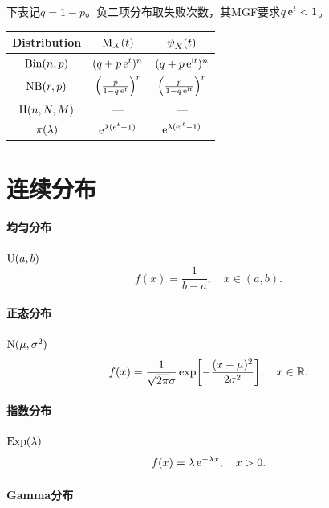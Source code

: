 下表记$q = 1 - p$。负二项分布取失败次数，其MGF要求$q\mathop{}\!\mathrm{e}^t < 1$。

\begin{center}
	\begin{tabular}{ccc}
		\toprule
		Distribution&$\operatorname{M}_X(t)$&$\operatorname{\psi}_X(t)$\\
		\midrule
		$\operatorname{Bin}(n,p)$&$(q + p\mathop{}\!\mathrm{e}^t)^n$&$(q + p\mathop{}\!\mathrm{e}^{\mathrm{i} t})^n$\\
		$\operatorname{NB}(r,p)$&$\Bigl(\frac p{1 - q\mathop{}\!\mathrm{e}^{t}}\Bigr)^r$&$\Bigl(\frac p{1 - q\mathop{}\!\mathrm{e}^{\mathrm{i} t}}\Bigr)^r$\\
		$\operatorname{H}(n,N,M)$&---&---\\
		$\operatorname{\pi}(\lambda)$&$\mathop{}\!\mathrm{e}^{\lambda(\mathop{}\!\mathrm{e}^t-1)}$&$\mathop{}\!\mathrm{e}^{\lambda(\mathop{}\!\mathrm{e}^{\mathrm{i} t}-1)}$\\
		\bottomrule
	\end{tabular}
\end{center}

\section{连续分布}

\paragraph{均匀分布}

$\operatorname{U}(a,b)$
\begin{equation}
	f(x) = \frac1{b - a},\quad x \in (a,b).
\end{equation}

\paragraph{正态分布}

$\operatorname{N}(\mu,\sigma^2)$
\begin{equation}
	f(x) = \frac1{\sqrt{2\pi}\sigma}\exp\biggl[-\frac{(x - \mu)^2}{2\sigma^2}\biggr],\quad x \in \mathbb{R}.
\end{equation}

\paragraph{指数分布}

$\operatorname{Exp}(\lambda)$
\begin{equation}
	f(x) = \lambda\mathop{}\!\mathrm{e}^{-\lambda x},\quad x > 0.
\end{equation}

\paragraph{Gamma分布}

